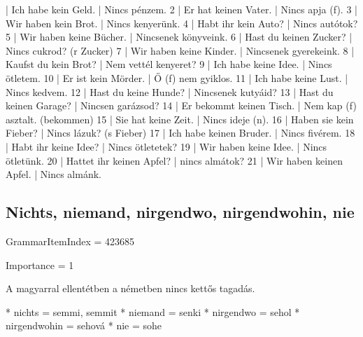 \documentclass{article}
\newenvironment{desc}{\verbatim}{\endverbatim}
\newenvironment{exmp}{\verbatim}{\endverbatim}
\begin{document}
\begin{exmp}
1 | Ich habe kein Geld. | Nincs pénzem.
2 | Er hat keinen Vater. | Nincs apja (f).
3 | Wir haben kein Brot. | Nincs kenyerünk.
4 | Habt ihr kein Auto? | Nincs autótok?
5 | Wir haben keine Bücher. | Nincsenek könyveink.
6 | Hast du keinen Zucker? | Nincs cukrod? (r Zucker)
7 | Wir haben keine Kinder. | Nincsenek gyerekeink.
8 | Kaufst du kein Brot? | Nem vettél kenyeret?
9 | Ich habe keine Idee. | Nincs ötletem.
10 | Er ist kein Mörder. | Ő (f) nem gyiklos.
11 | Ich habe keine Lust. | Nincs kedvem.
12 | Hast du keine Hunde? | Nincsenek kutyáid?
13 | Hast du keinen Garage? | Nincsen garázsod?
14 | Er bekommt keinen Tisch. | Nem kap (f) asztalt. (bekommen)
15 | Sie hat keine Zeit. | Nincs ideje (n).
16 | Haben sie kein Fieber? | Nincs lázuk? (s Fieber)
17 | Ich habe keinen Bruder. | Nincs fivérem.
18 | Habt ihr keine Idee? | Nincs ötletetek?
19 | Wir haben keine Idee. | Nincs ötletünk.
20 | Hattet ihr keinen Apfel? | nincs almátok?
21 | Wir haben keinen Apfel. | Nincs almánk.
\end{exmp}

\subsection{Nichts, niemand, nirgendwo, nirgendwohin, nie}

GrammarItemIndex = 423685

Importance = 1

\begin{desc}
A magyarral ellentétben a németben nincs kettős tagadás.

* nichts = semmi, semmit
* niemand = senki
* nirgendwo = sehol
* nirgendwohin = sehová
* nie = sohe
\end{desc}
\end{document}
